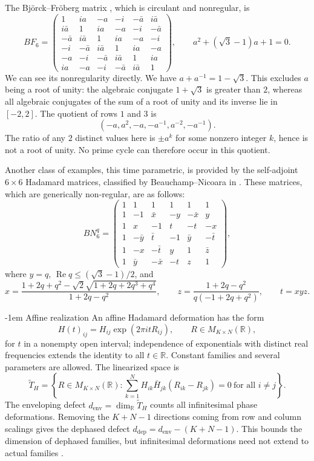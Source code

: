 \documentclass[11pt,a4paper]{article}
\makeatletter
\theoremstyle{plain}
\theoremstyle{definition}
\numberwithin{equation}{section}
\renewcommand\subsection{\@startsection{subsection}{2}{\z@}  {\medskipamount}  {-1em}  {\normalfont\normalsize\bfseries}}
\makeatother
\begin{document}
The Bj\"orck--Fr\"oberg matrix \cite{bjo,bjf}, which is circulant and nonregular, is
{\normalsize
$$BF_6=\begin{pmatrix}
1&ia&-a&-i&-\bar{a}&i\bar{a}\\
i\bar{a}&1&ia&-a&-i&-\bar{a}\\
-\bar{a}&i\bar{a}&1&ia&-a&-i\\
-i&-\bar{a}&i\bar{a}&1&ia&-a\\
-a&-i&-\bar{a}&i\bar{a}&1&ia\\
ia&-a&-i&-\bar{a}&i\bar{a}&1
\end{pmatrix},\qquad a^2+(\sqrt3-1)a+1=0.$$
}
We can see its nonregularity directly. We have $a+a^{-1}=1-\sqrt3$. This excludes $a$ being a root of unity: the algebraic conjugate $1+\sqrt3$ is greater than $2$, whereas all algebraic conjugates of the sum of a root of unity and its inverse lie in $[-2,2]$. The quotient of rows $1$ and $3$ is
$$(-a,a^2,-a,-a^{-1},a^{-2},-a^{-1}).$$
The ratio of any $2$ distinct values here is $\pm a^k$ for some nonzero integer $k$, hence is not a root of unity. No prime cycle can therefore occur in this quotient.

Another class of examples, this time parametric, is provided by the self-adjoint $6\times6$ Hadamard matrices, classified by Beauchamp--Nicoara in \cite{ben}. These matrices, which are generically non-regular, are as follows:
$$BN_6^q=\begin{pmatrix}
1&1&1&1&1&1\\
1&-1&\bar{x}&-y&-\bar{x}&y\\
1&x&-1&t&-t&-x\\
1&-\bar{y}&\bar{t}&-1&\bar{y}&-\bar{t}\\
1&-x&-\bar{t}&y&1&\bar{z}\\
1&\bar{y}&-\bar{x}&-t&z&1
\end{pmatrix},$$
where $y=q$, $\operatorname{Re}q\leq(\sqrt3-1)/2$, and
$$x=\frac{1+2q+q^2-\sqrt2\sqrt{1+2q+2q^3+q^4}}{1+2q-q^2},\qquad
z=\frac{1+2q-q^2}{q(-1+2q+q^2)},\qquad t=xyz.$$

\subsection{Affine realization}\label{bg:deformation}
An affine Hadamard deformation has the form
$$H(t)_{ij}=H_{ij}\exp(2\pi i tR_{ij}),\qquad R\in M_{K\times N}(\mathbb R),$$
for $t$ in a nonempty open interval; independence of exponentials with distinct real frequencies extends the identity to all $t\in\mathbb R$. Constant families and several parameters are allowed. The linearized space is
$$\widetilde T_H=\left\{R\in M_{K\times N}(\mathbb R):\sum_{k=1}^N H_{ik}\bar{H}_{jk}(R_{ik}-R_{jk})=0\ \text{for all }i\ne j\right\}.$$
The enveloping defect $d_{\mathrm{env}}=\dim_{\mathbb R}\widetilde T_H$ counts all infinitesimal phase deformations. Removing the $K+N-1$ directions coming from row and column scalings gives the dephased defect $d_{\mathrm{dep}}=d_{\mathrm{env}}-(K+N-1)$. This bounds the dimension of dephased families, but infinitesimal deformations need not extend to actual families \cite{dit,tz1,tz2}.
\end{document}
